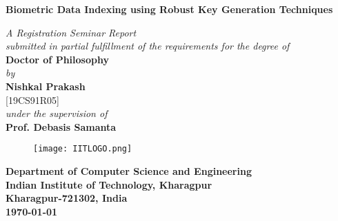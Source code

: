 % 

\thispagestyle{empty}
\vspace*{0.4cm}
\begin{center}
	{\huge \bf Biometric Data Indexing using Robust Key Generation Techniques}
	
	\vspace*{0.8cm} {\em A Registration Seminar Report\\ submitted in partial fulfillment of the requirements for the degree of}\\
	\vspace*{0.5cm}
	{\Large {\bf Doctor of Philosophy}}\\
	\vspace*{0.4cm}
	{\em by}\\
	\vspace*{0.4cm}
	{\Large {\bf Nishkal Prakash}}\\
	\vspace*{0.3cm}
	{\large [19CS91R05]}\\
	
	\vspace*{0.4cm}
	{\em under the supervision of }\\
	\vspace*{0.3cm}
	\Large {{\bf Prof. Debasis Samanta}}\\
	\vspace*{0.1cm}
	
	\vspace*{1.5cm}
	
	\begin{figure}[htbp]
		\centerline{\texttt{[image: IITLOGO.png]}}
	\end{figure}
	\vspace*{1cm}
	\Large {{\bf Department of Computer Science and Engineering\\
			\vspace*{0.1cm}
			Indian Institute of Technology, Kharagpur\\
			\vspace*{0.1cm}
			Kharagpur-721302, India\\
			\vspace*{0.1cm}
			\today}} 
\end{center}
\newpage

% 